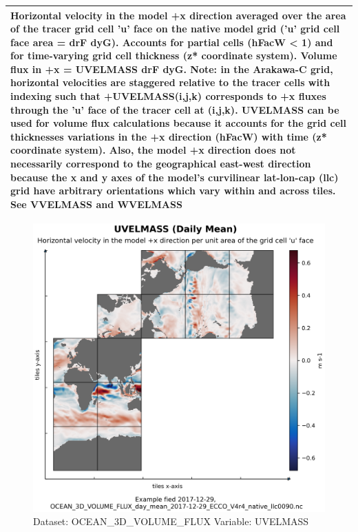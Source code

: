 \begin{longtable}{|p{}|p{}|p{}|p{}|}
\multicolumn{4}{|p{1\textwidth}|}{Horizontal velocity in the model +x direction averaged over the area of the tracer grid cell 'u' face on the native model grid ('u' grid cell face area = drF dyG). Accounts for partial cells (hFacW < 1) and for time-varying grid cell thickness (z* coordinate system). Volume flux in +x = UVELMASS drF dyG. Note: in the Arakawa-C grid, horizontal velocities are staggered relative to the tracer cells with indexing such that +UVELMASS(i,j,k) corresponds to +x fluxes through the 'u' face of the tracer cell at (i,j,k). UVELMASS can be used for volume flux calculations because it accounts for the grid cell thicknesses variations in the +x direction (hFacW) with time (z* coordinate system). Also, the model +x direction does not necessarily correspond to the geographical east-west direction because the x and y axes of the model's curvilinear lat-lon-cap (llc) grid have arbitrary orientations which vary within and across tiles. See VVELMASS and WVELMASS} \\ \hline
\end{longtable}

\begin{figure}[H]
\centering
\includegraphics[width=\textwidth]{../images/plots/native_plots/Ocean_Three-Dimensional_Volume_Fluxes/UVELMASS.png}
\caption{Dataset: OCEAN\_3D\_VOLUME\_FLUX Variable: UVELMASS}
\label{tab:table-OCEAN_3D_VOLUME_FLUX_UVELMASS-Plot}
\end{figure}
\pagebreak
